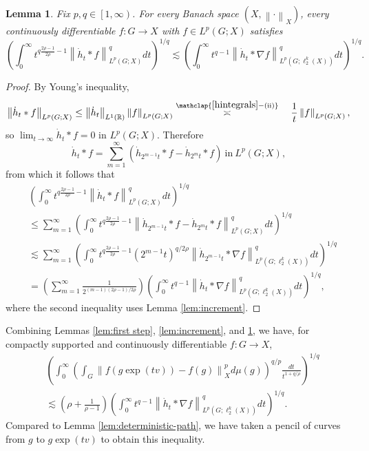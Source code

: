 \documentclass[11pt,reqno]{amsart}
\newtheorem{lemma}[theorem]{Lemma}
\newcommand{\1}{\mathbf 1}
\begin{document}
\begin{lemma}\label{lem:integrated increment}
Fix $p,q\in \left[1,\infty\right)$. For every Banach space $\left(X,\left\|\cdot\right\|_X\right)$, every continuously differentiable $f:G\to X$ with $f\in L^p\left(G;X\right)$ satisfies
\begin{equation*}
\left(\int_0^\infty t^{q\frac{2\rho-1}{2\rho}-1}\left\|\dot{h}_t*f\right\|_{L^p\left(G;X\right)}^qdt\right)^{1/q}\lesssim  \left(\int_0^\infty t^{q-1}\left\|\dot{h}_t*\nabla f\right\|_{L^p\left(G;\ell_2^k\left(X\right)\right)}^qdt\right)^{1/q}.
\end{equation*}
\end{lemma}
\begin{proof}
By Young's inequality,
\[
\left\|\dot{h}_t*f\right\|_{L^p\left(G;X\right)}\le \left\|\dot{h}_t\right\|_{L^1\left(\mathbb{R}\right)} \left\|f\right\|_{L^p\left(G;X\right)}\stackrel{\mathclap{\eqref{hintegrals}-\mathrm{(ii)}}}{\asymp}\quad \frac{1}{ t}\left\|f\right\|_{L^p\left(G;X\right)},
\]
so $\lim_{t\to\infty} \dot{h}_t*f=0$ in $L^p\left(G;X\right)$. Therefore
\[
\dot{h}_t*f=\sum_{m=1}^\infty \left(\dot{h}_{2^{m-1}t}*f-\dot{h}_{2^mt}*f\right)  \mathrm{~in~} L^p\left(G;X\right),
\]
from which it follows that
\begin{align*}
&\left(\int_0^\infty t^{q\frac{2\rho-1}{2\rho}-1}\left\|\dot{h}_t*f\right\|_{L^p\left(G;X\right)}^qdt\right)^{1/q}\\
 &\le \sum_{m=1}^\infty \left(\int_0^\infty t^{q\frac{2\rho-1}{2\rho}-1}\left\|\dot{h}_{2^{m-1}t}*f-\dot{h}_{2^mt}*f\right\|_{L^p\left(G;X\right)}^qdt\right)^{1/q}\\
&\lesssim  \sum_{m=1}^\infty \left(\int_0^\infty t^{q\frac{2\rho-1}{2\rho}-1}\left(2^{m-1}t\right)^{q/2\rho}\left\|\dot{h}_{2^{m-1}t}*\nabla f\right\|_{L^p\left(G;\ell_2^k\left(X\right)\right)}^qdt\right)^{1/q}\\
&= \left(\sum_{m=1}^\infty \frac{1}{2^{\left(m-1\right)\left(2\rho-1\right)/2\rho}}\right)\left(\int_0^\infty t^{q-1}\left\|\dot{h}_t*\nabla f\right\|_{L^p\left(G;\ell_2^k\left(X\right)\right)}^qdt\right)^{1/q},
\end{align*}
where the second inequality uses Lemma \ref{lem:increment}.
\end{proof}

Combining Lemmas \ref{lem:first step}, \ref{lem:increment}, and \ref{lem:integrated increment}, we have, for compactly supported and continuously differentiable $f:G\to X$,
\begin{align*}
	&\left(\int_0^\infty \left(\int_{G}\left\|f\left(g\exp\left(tv\right)\right)-f\left(g\right)\right\|_X^pd\mu\left(g\right)\right)^{q/p}\frac{dt}{t^{1+q/\rho}}\right)^{1/q}\\
	&\lesssim \left(\rho+\frac{1}{\rho-1}\right)
	 \left(\int_0^\infty t^{q-1}\left\|\dot{h}_t*\nabla f\right\|_{L^p\left(G;\ell_2^k\left(X\right)\right)}^qdt\right)^{1/q}.
\end{align*}
Compared to Lemma \ref{lem:deterministic-path}, we have taken a pencil of curves from $g$ to $g \exp\left(tv\right)$ to obtain this inequality.
\end{document}
